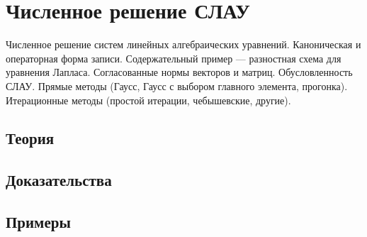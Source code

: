 
\section{Численное решение СЛАУ}
\label{sec:2.1.06-linear-systems-numerical}

\begin{ticket}
Численное решение систем линейных алгебраических уравнений. Каноническая и операторная форма записи. Содержательный пример — разностная схема для уравнения Лапласа. Согласованные нормы векторов и матриц. Обусловленность СЛАУ. Прямые методы (Гаусс, Гаусс с выбором главного элемента, прогонка). Итерационные методы (простой итерации, чебышевские, другие).
\end{ticket}

\subsection*{Теория}

\subsection*{Доказательства}

\subsection*{Примеры}
